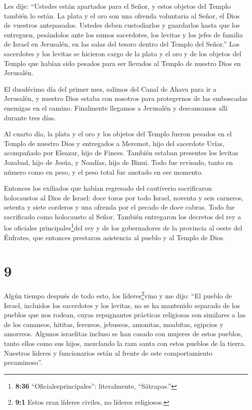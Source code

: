  Les dije: ``Ustedes están apartados para el Señor, y estos
objetos del Templo también lo están. La plata y el oro son una ofrenda
voluntaria al Señor, el Dios de vuestros antepasados. 
Ustedes deben custodiarlos y guardarlos hasta que los entreguen,
pesándolos ante los sumos sacerdotes, los levitas y los jefes de familia
de Israel en Jerusalén, en las salas del tesoro dentro del Templo del
Señor.''  Los sacerdotes y los levitas se hicieron cargo de
la plata y el oro y de los objetos del Templo que habían sido pesados
para ser llevados al Templo de nuestro Dios en Jerusalén.

 El duodécimo día del primer mes, salimos del Canal de
Ahava para ir a Jerusalén, y nuestro Dios estaba con nosotros para
protegernos de las emboscadas enemigas en el camino. 
Finalmente llegamos a Jerusalén y descansamos allí durante tres días.

 Al cuarto día, la plata y el oro y los objetos del Templo
fueron pesados en el Templo de nuestro Dios y entregados a Meremot, hijo
del sacerdote Urías, acompañado por Eleazar, hijo de Finees. También
estaban presentes los levitas Jozabad, hijo de Jesúa, y Noadías, hijo de
Binui.  Todo fue revisado, tanto en número como en peso, y
el peso total fue anotado en ese momento.

 Entonces los exiliados que habían regresado del cautiverio
sacrificaron holocaustos al Dios de Israel: doce toros por todo Israel,
noventa y seis carneros, setenta y siete corderos y una ofrenda por el
pecado de doce cabras. Todo fue sacrificado como holocausto al Señor.
 También entregaron los decretos del rey a los oficiales
principales\footnote{\textbf{8:36} ``Oficialesprincipales'':
  literalmente, ``Sátrapas.''}del rey y de los gobernadores de la
provincia al oeste del Éufrates, que entonces prestaron asistencia al
pueblo y al Templo de Dios.

\hypertarget{section-8}{%
\section{9}\label{section-8}}

 Algún tiempo después de todo esto, los
líderes\footnote{\textbf{9:1} Estos eran líderes civiles, no líderes
  religiosos.}vino y me dijo: ``El pueblo de Israel, incluidos los
sacerdotes y los levitas, no se ha mantenido separado de los pueblos que
nos rodean, cuyas repugnantes prácticas religiosas son similares a las
de los cananeos, hititas, ferezeos, jebuseos, amonitas, moabitas,
egipcios y amorreos.  Algunos israelitas incluso se han
casado con mujeres de estos pueblos, tanto ellos como sus hijos,
mezclando la raza santa con estos pueblos de la tierra. Nuestros líderes
y funcionarios están al frente de este comportamiento pecaminoso''.

